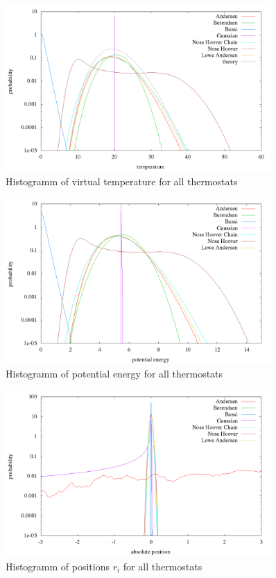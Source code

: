 \begin{figure}[H]
\centering
\includegraphics[width=0.9\textwidth]{./graphics/Histogramm_tempCol_one_T=20_p=64.png}
\caption{Histogramm of virtual temperature for all thermostats}
\label{im:temp_one}
\end{figure}

\begin{figure}[H]
\centering
\includegraphics[width=0.9\textwidth]{./graphics/Histogramm_epot_one_T=20_p=64.png}
\caption{Histogramm of potential energy for all thermostats}
\label{im:epot_one}
\end{figure}

\begin{figure}[H]
\centering
\includegraphics[width=0.9\textwidth]{./graphics/Histogramm_absPosition_one_T=20_p=64.png}
\caption{Histogramm of positions $r_i$ for all thermostats}
\label{im:absPos_one}
\end{figure} 

